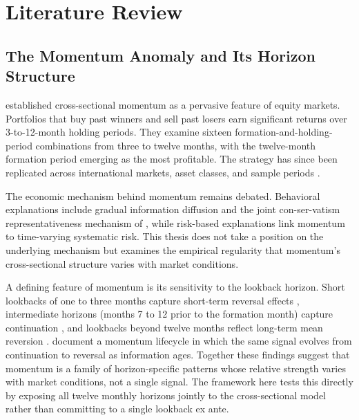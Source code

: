 
\clearpage
\section{Literature Review}\label{sec:literature}

\subsection{The Momentum Anomaly and Its Horizon Structure}\label{sec:lit_momentum}

\citet{JegadeeshTitman1993} established cross-sectional momentum as a pervasive feature of equity markets. Portfolios that buy past winners and sell past losers earn significant returns over 3-to-12-month holding periods. They examine sixteen formation-and-holding-period combinations from three to twelve months, with the twelve-month formation period emerging as the most profitable. The strategy has since been replicated across international markets, asset classes, and sample periods \citep{JegadeeshTitman2001, Asness2013}.


The economic mechanism behind momentum remains debated. Behavioral explanations include gradual information diffusion \citep{HongStein1999} and the joint \newline con-ser-vatism representativeness mechanism of \citet{Barberis1998}, while risk-based explanations link momentum to time-varying systematic risk. This thesis does not take a position on the underlying mechanism but examines the empirical regularity that momentum's cross-sectional structure varies with market conditions.

A defining feature of momentum is its sensitivity to the lookback horizon. Short lookbacks of one to three months capture short-term reversal effects \citep{Jegadeesh1990, Lehmann1990}, intermediate horizons (months 7 to 12 prior to the formation month) capture continuation \citep{NovyMarx2012}, and lookbacks beyond twelve months reflect long-term mean reversion \citep{DeBondtThaler1985}. \citet{LeeSwaminathan2000} document a momentum lifecycle in which the same signal evolves from continuation to reversal as information ages. Together these findings suggest that momentum is a family of horizon-specific patterns whose relative strength varies with market conditions, not a single signal. The framework here tests this directly by exposing all twelve monthly horizons jointly to the cross-sectional model rather than committing to a single lookback ex ante.

